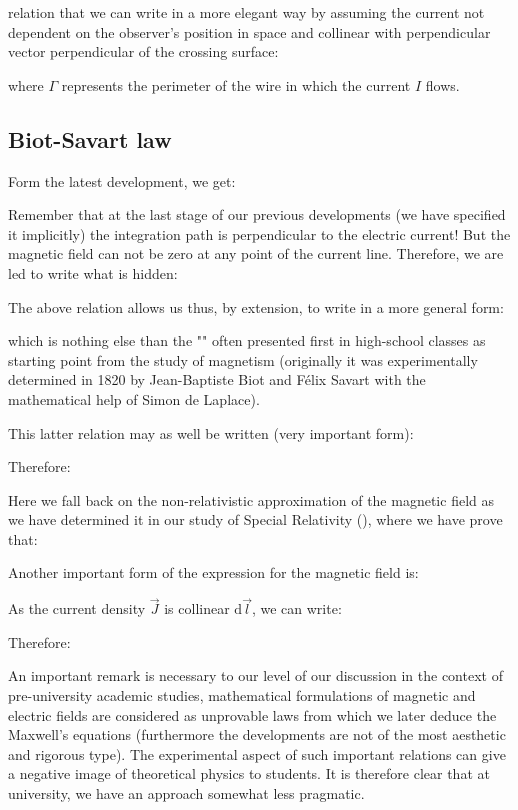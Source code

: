 	relation that we can write in a more elegant way by assuming the current not dependent on the observer's position in space and collinear with perpendicular vector perpendicular of the crossing surface:
	
	where $\Gamma$ represents the perimeter of the wire in which the current $I$ flows.
	
	\subsection{Biot-Savart law}
	Form the latest development, we get:
	
	Remember that at the last stage of our previous developments (we have specified it implicitly) the integration path is perpendicular to the electric current! But the magnetic field can not be zero at any point of the current line. Therefore, we are led to write what is hidden:
	
	The above relation allows us thus, by extension, to write in a more general form:
	 
	which is nothing else than the "" often presented first in high-school classes as starting point from the study of magnetism (originally it was experimentally determined in 1820 by Jean-Baptiste Biot and Félix Savart with the mathematical help of Simon de Laplace).
	
	This latter relation may as well be written (very important form):
	
	Therefore:
	
	Here we fall back on the non-relativistic approximation of the magnetic field as we have determined it in our study of Special Relativity (), where we have prove that:
	
	Another important form of the expression for the magnetic field is:
	
	As the current density $\vec{J}$ is collinear $\mathrm{d}\vec{l}$, we can write:
	
	Therefore:
	
	An important remark is necessary to our level of our discussion in the context of pre-university academic studies, mathematical formulations of magnetic and electric fields are considered as unprovable laws from which we later deduce the Maxwell's equations (furthermore the developments are not of the most aesthetic and rigorous type). The experimental aspect of such important relations can give a negative image of theoretical physics to students. It is therefore clear that at university, we have an approach somewhat less pragmatic.
	
